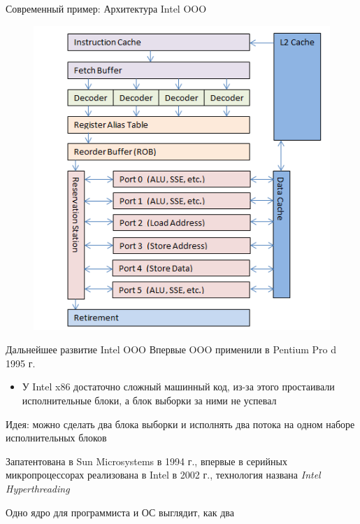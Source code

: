 \documentclass[xetex,aspectratio=43]{beamer}
\begin{document}
\begin{frame}{Современный пример: Архитектура Intel OOO}
    \begin{figure}
        \includegraphics[height=0.8\textheight]{img/11.Intel_OOO.png}
    \end{figure}
\end{frame}

\begin{frame}{Дальнейшее развитие Intel OOO}
        Впервые OOO применили в Pentium Pro d 1995 г.

        \begin{itemize}
            \tightlist
            \item
            У Intel x86 достаточно сложный машинный код, из-за этого простаивали
            исполнительные блоки, а блок выборки за ними не успевал
        \end{itemize}

        \pause

        Идея: можно сделать два блока выборки и исполнять два потока на одном
        наборе исполнительных блоков

        Запатентована в Sun Microsystems в 1994 г., впервые в серийных
        микропроцессорах реализована в Intel в 2002 г., технология названа \emph{Intel
        Hyperthreading}

        Одно ядро для программиста и ОС выглядит, как два
\end{frame}
\end{document}

